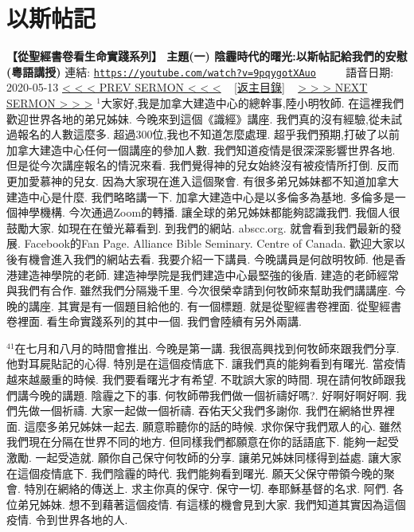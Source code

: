 \documentclass{book}
\begin{document}
\section{以斯帖記}
\label{sec:9pqygotXAuo}
\textbf{【從聖經書卷看生命實踐系列】 主題(一) 陰霾時代的曙光:以斯帖記給我們的安慰 (粵語講授)}
\newline
\newline
連結: \href{https://youtube.com/watch?v=9pqygotXAuo}{\texttt{https://youtube.com/watch?v=9pqygotXAuo}} ~~~~ 語音日期: 2020-05-13
\newline
\newline
\hyperref[sec:JwFqk5bcKhM]{\small{< < < PREV SERMON < < <}}
~
\hyperref[sec:index]{\small{[返主目錄]}}
~
\hyperref[sec:qcKLit3iF4o]{\small{> > > NEXT SERMON > > >}}
\newline
\newline
$^{1}$大家好,我是加拿大建造中心的總幹事,陸小明牧師.
在這裡我們歡迎世界各地的弟兄姊妹.
今晚來到這個《識經》講座.
我們真的沒有經驗,從未試過報名的人數這麼多.
超過300位,我也不知道怎麼處理.
超乎我們預期,打破了以前加拿大建造中心任何一個講座的參加人數.
我們知道疫情是很深深影響世界各地.
但是從今次講座報名的情況來看.
我們覺得神的兒女始終沒有被疫情所打倒.
反而更加愛慕神的兒女.
因為大家現在進入這個聚會.
有很多弟兄姊妹都不知道加拿大建造中心是什麼.
我們略略講一下.
加拿大建造中心是以多倫多為基地.
多倫多是一個神學機構.
今次通過Zoom的轉播.
讓全球的弟兄姊妹都能夠認識我們.
我個人很鼓勵大家.
如現在在螢光幕看到.
到我們的網站.
abscc.org.
就會看到我們最新的發展.
Facebook的Fan Page.
Alliance Bible Seminary.
Centre of Canada.
歡迎大家以後有機會進入我們的網站去看.
我要介紹一下講員.
今晚講員是何啟明牧師.
他是香港建造神學院的老師.
建造神學院是我們建造中心最堅強的後盾.
建造的老師經常與我們有合作.
雖然我們分隔幾千里.
今次很榮幸請到何牧師來幫助我們講講座.
今晚的講座.
其實是有一個題目給他的.
有一個標題.
就是從聖經書卷裡面.
從聖經書卷裡面.
看生命實踐系列的其中一個.
我們會陸續有另外兩講.

$^{41}$在七月和八月的時間會推出.
今晚是第一講.
我很高興找到何牧師來跟我們分享.
他對耳屍貼記的心得.
特別是在這個疫情底下.
讓我們真的能夠看到有曙光.
當疫情越來越嚴重的時候.
我們要看曙光才有希望.
不耽誤大家的時間.
現在請何牧師跟我們講今晚的講題.
陰霾之下的事.
何牧師帶我們做一個祈禱好嗎?.
好啊好啊好啊.
我們先做一個祈禱.
大家一起做一個祈禱.
吞佑天父我們多謝你.
我們在網絡世界裡面.
這麼多弟兄姊妹一起去.
願意聆聽你的話的時候.
求你保守我們眾人的心.
雖然我們現在分隔在世界不同的地方.
但同樣我們都願意在你的話語底下.
能夠一起受激勵.
一起受造就.
願你自己保守何牧師的分享.
讓弟兄姊妹同樣得到益處.
讓大家在這個疫情底下.
我們陰霾的時代.
我們能夠看到曙光.
願天父保守帶領今晚的聚會.
特別在網絡的傳送上.
求主你真的保守.
保守一切.
奉耶穌基督的名求.
阿們.
各位弟兄姊妹.
想不到藉著這個疫情.
有這樣的機會見到大家.
我們知道其實因為這個疫情.
令到世界各地的人.
\end{document}
